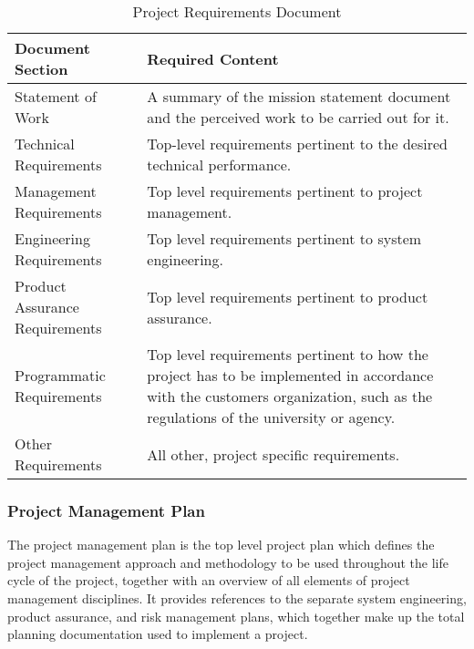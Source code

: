 \begin{table}[h]
\caption{Project Requirements Document}
\centering
\begin{tabular}{l p{8cm}}
\toprule
\textbf{Document Section} & \textbf{Required Content} \\
\midrule
Statement of Work & A summary of the mission statement document and the perceived work to be carried out for it. \\
Technical Requirements & Top-level requirements pertinent to the desired technical performance. \\
Management Requirements & Top level requirements pertinent to project management. \\
Engineering Requirements & Top level requirements pertinent to system engineering. \\
Product Assurance Requirements & Top level requirements pertinent to product assurance. \\
Programmatic Requirements & Top level requirements pertinent to how the project has to be implemented in accordance with the customers organization, such as the regulations of the university or agency. \\
Other Requirements & All other, project specific requirements. \\
\bottomrule
\end{tabular}
\end{table}

\clearpage
\subsubsection{Project Management Plan}
\label{app:Project Management Plan}

The project management plan is the top level project plan which defines the project management approach and methodology to be used throughout the life cycle of the project, together with an overview of all elements of project management disciplines. It provides references to the separate system engineering, product assurance, and risk management plans, which together make up the total planning documentation used to implement a project.

